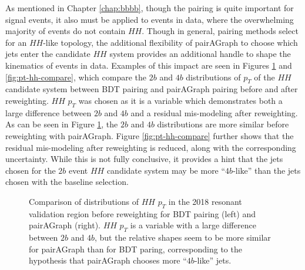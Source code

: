 As mentioned in Chapter \ref{chap:bbbb}, though the pairing is quite important for signal events, it also 
must be applied to events in data, where the overwhelming majority of events do not contain $HH$. Though in 
general, pairing methods select for an $HH$-like topology, the additional flexibility of pairAGraph to 
choose which jets enter the candidate $HH$ system provides an additional handle to shape the 
kinematics of events in data. Examples of this impact are seen in Figures \ref{fig:no-rw-pt-hh-compare} and 
\ref{fig:pt-hh-compare}, which compare the $2b$ and $4b$ distributions of $p_{T}$ of the $HH$ candidate 
system between BDT pairing and pairAGraph pairing before and after reweighting. $HH$ $p_{T}$ was 
chosen as it is a variable which demonstrates both a large difference between $2b$ and $4b$ and 
a residual mis-modeling after reweighting. As can be seen in Figure \ref{fig:no-rw-pt-hh-compare}, 
the $2b$ and $4b$ distributions are more similar before reweighting with pairAGraph. Figure \ref{fig:pt-hh-compare} 
further shows that the residual mis-modeling after reweighting is reduced, along with the corresponding uncertainty. 
While this is not fully conclusive, it provides a hint that the jets chosen for the $2b$ event $HH$ candidate 
system may be more ``$4b$-like'' than the jets chosen with the baseline selection.

\begin{figure}[ht]
	\centering
	\caption{\label{fig:no-rw-pt-hh-compare} Comparison of distributions of $HH$ $p_{T}$ in the 2018 resonant validation region before reweighting for BDT pairing (left) and pairAGraph (right). $HH$ $p_{T}$ is a variable with a 
	large difference between $2b$ and $4b$, but the relative shapes seem to be more similar for pairAGraph than 
	for BDT paring, corresponding to the hypothesis that pairAGraph chooses more ``$4b$-like'' jets.}
\end{figure}


